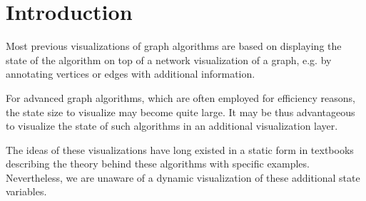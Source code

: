 \section{Introduction}

Most previous visualizations of graph algorithms are based on displaying the state of the algorithm on top of a network visualization of a graph, e.g. by annotating vertices or edges with additional information.

For advanced graph algorithms, which are often employed for efficiency reasons, the state size to visualize may become quite large. It may be thus advantageous to visualize the state of such algorithms in an additional visualization layer. 

The ideas of these visualizations have long existed in a static form in textbooks describing the theory behind these algorithms with specific examples. Nevertheless, we are unaware of a dynamic visualization of these additional state variables.

 